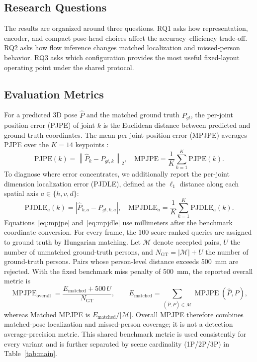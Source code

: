 \documentclass[conference,onecolumn]{IEEEtran}
\begin{document}
\subsection{Research Questions}
The results are organized around three questions. RQ1 asks how representation, encoder, and compact pose-head choices affect the accuracy--efficiency trade-off. RQ2 asks how flow inference changes matched localization and missed-person behavior. RQ3 asks which configuration provides the most useful fixed-layout operating point under the shared protocol.

\subsection{Evaluation Metrics}
\label{sec:eval-metrics}
For a predicted 3D pose $\hat{P}$ and the matched ground truth $P_{gt}$, the per-joint position error (PJPE) of joint $k$ is the Euclidean distance between predicted and ground-truth coordinates. The mean per-joint position error (MPJPE) averages PJPE over the $K{=}14$ keypoints \cite{ionescu2014h36m}:
\begin{equation}
    \mathrm{PJPE}(k) = \left\| \hat{P}_k - P_{gt,k} \right\|_2,\quad
    \mathrm{MPJPE} = \frac{1}{K}\sum_{k=1}^{K} \mathrm{PJPE}(k).
\label{eq:mpjpe}
\end{equation}
To diagnose where error concentrates, we additionally report the per-joint dimension localization error (PJDLE), defined as the $\ell_1$ distance along each spatial axis $a \in \{h,v,d\}$:
\begin{equation}
    \mathrm{PJDLE}_a(k) = \left| \hat{P}_{k,a} - P_{gt,k,a} \right|,\quad
    \mathrm{MPJDLE}_a = \frac{1}{K}\sum_{k=1}^{K} \mathrm{PJDLE}_a(k).
\label{eq:mpjdle}
\end{equation}
Equations~\ref{eq:mpjpe} and~\ref{eq:mpjdle} use millimeters after the benchmark coordinate conversion.
For every frame, the 100 score-ranked queries are assigned to ground truth by Hungarian matching. Let $\mathcal M$ denote accepted pairs, $U$ the number of unmatched ground-truth persons, and $N_{\mathrm{GT}}=|\mathcal M|+U$ the number of ground-truth persons. Pairs whose person-level distance exceeds 500~mm are rejected. With the fixed benchmark miss penalty of 500~mm, the reported overall metric is
\begin{equation}
\operatorname{MPJPE}_{\mathrm{overall}}=
\frac{E_{\mathrm{matched}}+500\,U}{N_{\mathrm{GT}}},\qquad
E_{\mathrm{matched}}=\sum_{(\hat P,P)\in\mathcal M}\operatorname{MPJPE}(\hat P,P),
\label{eq:overall-mpjpe}
\end{equation}
whereas Matched MPJPE is $E_{\mathrm{matched}}/|\mathcal M|$. Overall MPJPE therefore combines matched-pose localization and missed-person coverage; it is not a detection average-precision metric. This shared benchmark metric is used consistently for every variant and is further separated by scene cardinality (1P/2P/3P) in Table~\ref{tab:main}.
\end{document}
